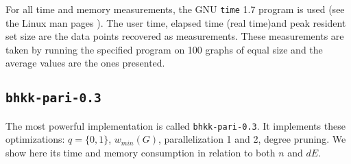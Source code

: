 \documentclass[a4paper]{article}
\newcommand{\code}{\texttt}
\begin{document}
For all time and memory measurements, the GNU \code{time} 1.7 program is used (see the Linux man pages \cite{time}). The user time, elapsed time (real time)\footnotemark and peak resident set size are the data points recovered as measurements. These measurements are taken by running the specified program on 100 graphs of equal size and the average values are the ones presented.


\subsection{\code{bhkk-pari-0.3}}
The most powerful implementation is called \code{bhkk-pari-0.3}. It implements these optimizations: $q = \{0, 1\}$, $w_{min}(G)$, parallelization 1 and 2, degree pruning. We show here its time and memory consumption in relation to both $n$ and $dE$.
\end{document}
